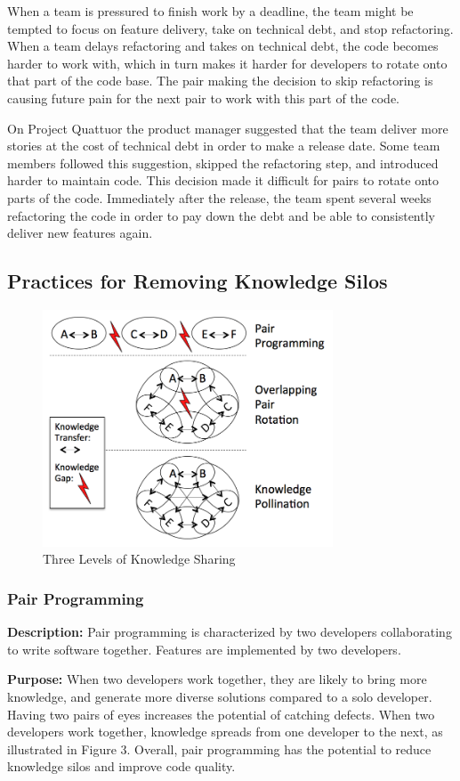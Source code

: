 \begin{table}[]
When a team is pressured to finish work by a deadline, the team might be tempted to focus on feature delivery, take on technical debt, and stop refactoring. When a team delays refactoring and takes on technical debt, the code becomes harder to work with, which in turn makes it harder for developers to rotate onto that part of the code base. The pair making the decision to skip refactoring is causing future pain for the next pair to work with this part of the code. 

On Project Quattuor the product manager suggested that the team deliver more stories at the cost of technical debt in order to make a release date. Some team members followed this suggestion, skipped the refactoring step, and introduced harder to maintain code. This decision made it difficult for pairs to rotate onto parts of the code. Immediately after the release, the team spent several weeks refactoring the code in order to pay down the debt and be able to consistently deliver new features again.  
\subsection{Practices for Removing Knowledge Silos}
\begin{figure}[t]
\centering
\includegraphics[width=3.4in]{KnowledgeSharingLevels.png}
\caption{Three Levels of Knowledge Sharing}
\label{KnowledgeSharing}
\end{figure}

\subsubsection{Pair Programming}
\textbf{Description:} Pair programming is characterized by two developers collaborating to write software together. Features are implemented by two developers.

\textbf{Purpose:} When two developers work together, they are likely to bring more knowledge, and generate more diverse solutions compared to a solo developer. Having two pairs of eyes increases the potential of catching defects. When two developers work together, knowledge spreads from one developer to the next, as illustrated in Figure 3. Overall, pair programming has the potential to reduce knowledge silos and improve code quality.


\end{table}
